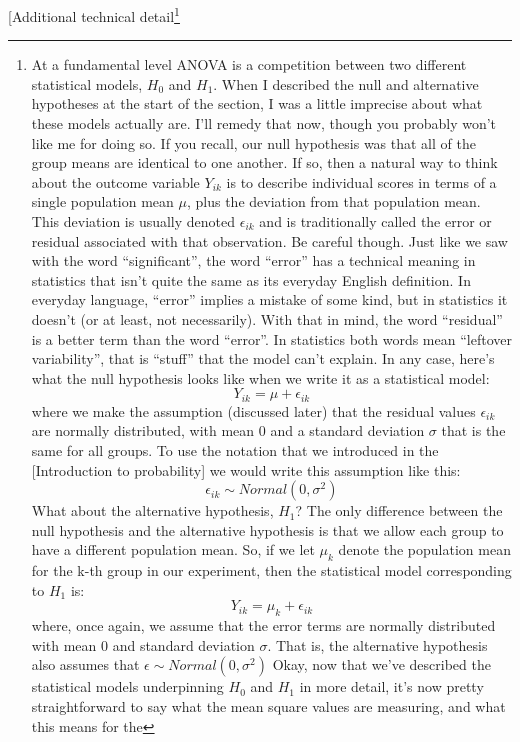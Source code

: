 \documentclass[
  a4paper,
]{book}
\begin{document}
{[}Additional technical detail\footnote{At a fundamental level ANOVA is
  a competition between two different statistical models, \(H_0\) and
  \(H_1\). When I described the null and alternative hypotheses at the
  start of the section, I was a little imprecise about what these models
  actually are. I'll remedy that now, though you probably won't like me
  for doing so. If you recall, our null hypothesis was that all of the
  group means are identical to one another. If so, then a natural way to
  think about the outcome variable \(Y_{ik}\) is to describe individual
  scores in terms of a single population mean \(\mu\), plus the
  deviation from that population mean. This deviation is usually denoted
  \(\epsilon_{ik}\) and is traditionally called the error or residual
  associated with that observation. Be careful though. Just like we saw
  with the word ``significant'', the word ``error'' has a technical
  meaning in statistics that isn't quite the same as its everyday
  English definition. In everyday language, ``error'' implies a mistake
  of some kind, but in statistics it doesn't (or at least, not
  necessarily). With that in mind, the word ``residual'' is a better
  term than the word ``error''. In statistics both words mean ``leftover
  variability'', that is ``stuff'' that the model can't explain. In any
  case, here's what the null hypothesis looks like when we write it as a
  statistical model: \[Y_{ik}=\mu+\epsilon_{ik}\] where we make the
  assumption (discussed later) that the residual values
  \(\epsilon_{ik}\) are normally distributed, with mean \(0\) and a
  standard deviation \(\sigma\) that is the same for all groups. To use
  the notation that we introduced in the {[}Introduction to
  probability{]} we would write this assumption like this:
  \[\epsilon_{ik} \sim Normal(0,\sigma^2)\] What about the alternative
  hypothesis, \(H_1\)? The only difference between the null hypothesis
  and the alternative hypothesis is that we allow each group to have a
  different population mean. So, if we let \(\mu_k\) denote the
  population mean for the k-th group in our experiment, then the
  statistical model corresponding to \(H_1\) is:
  \[Y_{ik}=\mu_k+\epsilon_{ik}\] where, once again, we assume that the
  error terms are normally distributed with mean 0 and standard
  deviation \(\sigma\). That is, the alternative hypothesis also assumes
  that \(\epsilon \sim Normal(0,\sigma^2)\) Okay, now that we've
  described the statistical models underpinning \(H_0\) and \(H_1\) in
  more detail, it's now pretty straightforward to say what the mean
  square values are measuring, and what this means for the
}
\end{document}
